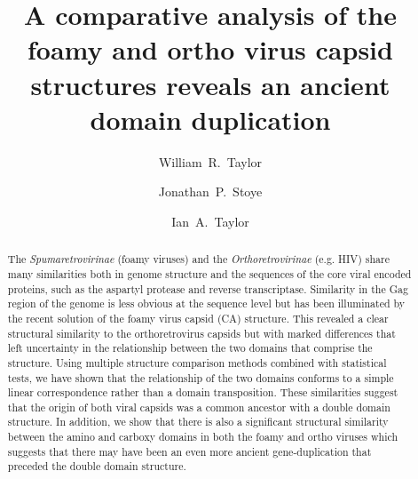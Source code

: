 \documentclass[preprint,12pt]{elsarticle}
\begin{document}
\begin{frontmatter}



\title{A comparative analysis of the foamy and ortho virus capsid structures
           reveals an ancient domain duplication}

\author[label1]{William~R.~Taylor}
\author[label2]{Jonathan~P.~Stoye}
\author[label3]{Ian~A.~Taylor}
\address[label1]{Computational Cell and Molecular Biology,}
\address[label2]{Retrovirus-Host Interactions,}
\address[label3]{Macromolecular Structure Laboratory.}
\address{Francis Crick Institute, 1 Midland Rd., London NW1 1AT, UK}


\begin{abstract}
The {\em Spumaretrovirinae} (foamy viruses) and the {\em Orthoretrovirinae} (e.g. HIV) share
many similarities both in genome structure and the sequences of the core viral encoded proteins,
such as the aspartyl protease and reverse transcriptase.  Similarity in the Gag region of the 
genome is less obvious at the sequence level but has been illuminated by the recent solution of
the foamy virus capsid (CA) structure.   This revealed a clear structural similarity to the 
orthoretrovirus capsids but with marked differences that left uncertainty in the relationship
between the two domains that comprise the structure.   Using multiple structure comparison
methods combined with statistical tests, we have shown that the relationship of the two domains
conforms to a simple linear correspondence rather than a domain transposition.   These
similarities suggest that the origin of both viral capsids was a common ancestor with a double
domain structure.  In addition, we show that there is also a significant structural similarity 
between the amino and carboxy domains in both the foamy and ortho viruses which suggests that
there may have been an even more ancient gene-duplication that preceded the double domain structure.
\end{abstract}


\end{frontmatter}
\end{document}

